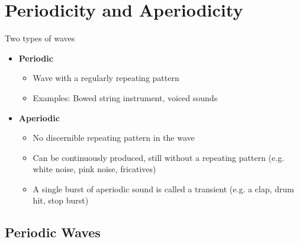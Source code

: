 \documentclass[professionalfonts]{beamer}
\begin{document}
\section*{Periodicity and Aperiodicity}

\begin{frame}{Two types of waves}
    \begin{itemize}
        \item \textbf{Periodic}
        \begin{itemize}
            \item Wave with a regularly repeating pattern 
            \item Examples: Bowed string instrument, voiced sounds 
        \end{itemize}
        \item \textbf{Aperiodic}
        \begin{itemize}
            \item No discernible repeating pattern in the wave 
            \item Can be continuously produced, still without a repeating pattern (e.g. white noise, pink noise, fricatives) 
            \item A single burst of aperiodic sound is called a transient (e.g. a clap, drum hit, stop burst)
        \end{itemize}
    \end{itemize}
\end{frame}

\subsection*{Periodic Waves}
\end{document}
